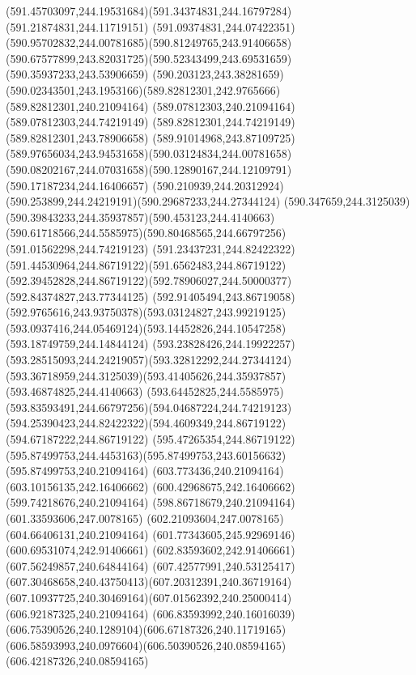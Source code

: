 {{	\curveto(591.45703097,244.19531684)(591.34374831,244.16797284)(591.21874831,244.11719151)
	\curveto(591.09374831,244.07422351)(590.95702832,244.00781685)(590.81249765,243.91406658)
	\curveto(590.67577899,243.82031725)(590.52343499,243.69531659)(590.35937233,243.53906659)
	\curveto(590.203123,243.38281659)(590.02343501,243.1953166)(589.82812301,242.9765666)
	\lineto(589.82812301,240.21094164)
	\lineto(589.07812303,240.21094164)
	\lineto(589.07812303,244.74219149)
	\lineto(589.82812301,244.74219149)
	\lineto(589.82812301,243.78906658)
	\curveto(589.91014968,243.87109725)(589.97656034,243.94531658)(590.03124834,244.00781658)
	\curveto(590.08202167,244.07031658)(590.12890167,244.12109791)(590.17187234,244.16406657)
	\curveto(590.210939,244.20312924)(590.253899,244.24219191)(590.29687233,244.27344124)
	\curveto(590.347659,244.3125039)(590.39843233,244.35937857)(590.453123,244.4140663)
	\curveto(590.61718566,244.5585975)(590.80468565,244.66797256)(591.01562298,244.74219123)
	\curveto(591.23437231,244.82422322)(591.44530964,244.86719122)(591.6562483,244.86719122)
	\curveto(592.39452828,244.86719122)(592.78906027,244.50000377)(592.84374827,243.77344125)
	\curveto(592.91405494,243.86719058)(592.9765616,243.93750378)(593.03124827,243.99219125)
	\curveto(593.0937416,244.05469124)(593.14452826,244.10547258)(593.18749759,244.14844124)
	\curveto(593.23828426,244.19922257)(593.28515093,244.24219057)(593.32812292,244.27344124)
	\curveto(593.36718959,244.3125039)(593.41405626,244.35937857)(593.46874825,244.4140663)
	\curveto(593.64452825,244.5585975)(593.83593491,244.66797256)(594.04687224,244.74219123)
	\curveto(594.25390423,244.82422322)(594.4609349,244.86719122)(594.67187222,244.86719122)
	\curveto(595.47265354,244.86719122)(595.87499753,244.4453163)(595.87499753,243.60156632)
	\lineto(595.87499753,240.21094164)
	\closepath
	\moveto(603.773436,240.21094164)
	\lineto(603.10156135,242.16406662)
	\lineto(600.42968675,242.16406662)
	\lineto(599.74218676,240.21094164)
	\lineto(598.86718679,240.21094164)
	\lineto(601.33593606,247.0078165)
	\lineto(602.21093604,247.0078165)
	\lineto(604.66406131,240.21094164)
	\closepath
	\moveto(601.77343605,245.92969146)
	\lineto(600.69531074,242.91406661)
	\lineto(602.83593602,242.91406661)
	\closepath
	\moveto(607.56249857,240.64844164)
	\curveto(607.42577991,240.53125417)(607.30468658,240.43750413)(607.20312391,240.36719164)
	\curveto(607.10937725,240.30469164)(607.01562392,240.25000414)(606.92187325,240.21094164)
	\curveto(606.83593992,240.16016039)(606.75390526,240.1289104)(606.67187326,240.11719165)
	\curveto(606.58593993,240.0976604)(606.50390526,240.08594165)(606.42187326,240.08594165)
}}

